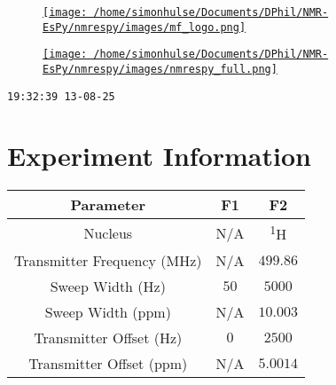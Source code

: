 \documentclass[8pt]{article}
\begin{document}
\begin{figure}[!ht]
\begin{minipage}[b][2.5cm][c]{.72\textwidth}
\href{http://foroozandeh.chem.ox.ac.uk/home}%
{\texttt{[image: /home/simonhulse/Documents/DPhil/NMR-EsPy/nmrespy/images/mf\_logo.png]}}
\end{minipage}
\begin{minipage}[b][2.5cm][c]{.27\textwidth}
\href{https://foroozandehgroup.github.io/NMR-EsPy}%
{\texttt{[image: /home/simonhulse/Documents/DPhil/NMR-EsPy/nmrespy/images/nmrespy\_full.png]}}
\end{minipage}
\end{figure}
\texttt{19:32:39 13-08-25}



\section*{Experiment Information}
\begin{longtable}[l]{c c c}
\toprule
Parameter & F1 & F2\\
\midrule
Nucleus & N/A & \textsuperscript{1}H\\
Transmitter Frequency (MHz) & N/A & $\num{499.86}$\\
Sweep Width (Hz) & $\num{50}$ & $\num{5000}$\\
Sweep Width (ppm) & N/A & $\num{10.003}$\\
Transmitter Offset (Hz) & $\num{0}$ & $\num{2500}$\\
Transmitter Offset (ppm) & N/A & $\num{5.0014}$\\
\bottomrule
\end{longtable}
\end{document}

